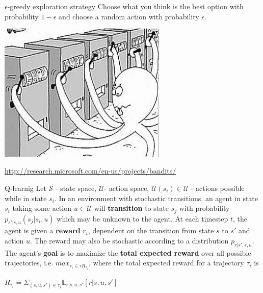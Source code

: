 \documentclass[15pt]{beamer}
\begin{document}
\begin{frame}{$\epsilon$-greedy exploration strategy}
  Choose what you think is the best option with probability $1-\epsilon$ and choose a random action with probability $\epsilon$.

  \begin{center}
  \includegraphics[width=0.6\textwidth]{exploration.jpg}
  \end{center}

  \begin{center}
  \begin{tiny}
  \url{http://research.microsoft.com/en-us/projects/bandits/}  
  \end{tiny}
  \end{center}
\end{frame}


\begin{frame}{Q-learnig}
  Let $\mathcal{S}$ - state space, $\mathcal{U}$- action space, $\mathcal{U}(s_i) \in \mathcal{U}$ - actions possible while in state $s_i$.
  \vskip0.1in
  In an environment with stochastic transitions, an agent in state $s_i$ taking some action $u \in \mathcal{U}$ will \textbf{transition} to state $s_j$ with probability $p_{s'|s, u}(s_j | s_i, u)$ which may be unknown to the agent.
  \vskip0.1in
  At each timestep $t$, the agent is given a \textbf{reward} $r_t$, dependent on the transition from state $s$ to $s'$ and action $u$. The reward may also be stochastic according to a distribution $p_{r|s', s, u}$.
  \vskip0.1in
  The agent's \textbf{goal} is to maximize the \textbf{total expected reward} over all possible trajectories, i.e. $max_{\tau_i \in \tau R_{\tau_i}}$, where the total expected reward for a trajectory $\tau_i$ is

  \begin{center}
  $R_{\tau_i} = \Sigma_{(s, u, s') \in \tau_i} \mathds{E}_{r|s, u, s'}[r|s, u, s']$
  \end{center}
\end{frame}
\end{document}
